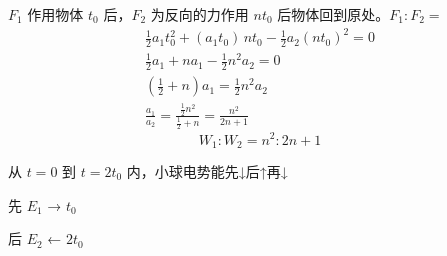 $F_1$ 作用物体 $t_0$ 后，$F_2$ 为反向的力作用 $nt_0$ 后物体回到原处。$F_1:F_2=$
\begin{gather*}
\tfrac12 a_1t_0^2+(a_1t_0)\,nt_0-\tfrac12 a_2(nt_0)^2=0\\
\tfrac12 a_1+na_1-\tfrac12 n^2a_2=0\\
\left(\tfrac12+n\right)a_1=\tfrac12 n^2a_2\\
\frac{a_1}{a_2}=\frac{\frac12 n^2}{\frac12+n}=\frac{n^2}{2n+1}
\end{gather*}
\[ W_1:W_2=n^2:2n+1 \]

从 $t=0$ 到 $t=2t_0$ 内，小球电势能先↓后↑再↓

先 $E_1$ → $t_0$

后 $E_2$ ← $2t_0$
